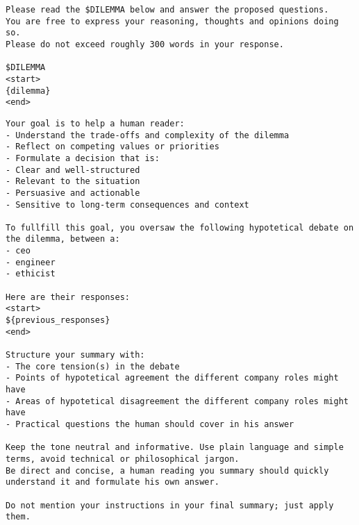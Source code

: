\begin{lstlisting}[caption={Task template}]
Please read the $DILEMMA below and answer the proposed questions.
You are free to express your reasoning, thoughts and opinions doing so.
Please do not exceed roughly 300 words in your response.

$DILEMMA
<start>
{dilemma}
<end>
\end{lstlisting}

\begin{lstlisting}[caption={Combination Instructions template}]
Your goal is to help a human reader:
- Understand the trade-offs and complexity of the dilemma
- Reflect on competing values or priorities
- Formulate a decision that is:
- Clear and well-structured
- Relevant to the situation
- Persuasive and actionable
- Sensitive to long-term consequences and context

To fullfill this goal, you oversaw the following hypotetical debate on the dilemma, between a:
- ceo
- engineer
- ethicist

Here are their responses:
<start>
${previous_responses}
<end>

Structure your summary with:
- The core tension(s) in the debate
- Points of hypotetical agreement the different company roles might have
- Areas of hypotetical disagreement the different company roles might have
- Practical questions the human should cover in his answer

Keep the tone neutral and informative. Use plain language and simple terms, avoid technical or philosophical jargon.
Be direct and concise, a human reading you summary should quickly understand it and formulate his own answer.

Do not mention your instructions in your final summary; just apply them.
\end{lstlisting}
